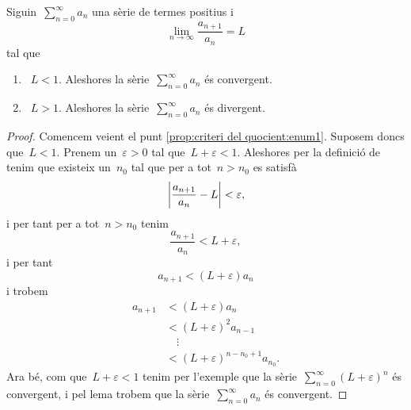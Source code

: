 \documentclass[../../main.tex]{subfiles}
\begin{document}
    \begin{proposition}
        \label{prop:criteri del quocient}
        Siguin~\(\sum_{n=0}^{\infty}a_{n}\) una sèrie de termes positius i
        \[
            \lim_{n\to\infty}\frac{a_{n+1}}{a_{n}}=L
        \]
        tal que
        \begin{enumerate}
            \item\label{prop:criteri del quocient:enum1}~\(L<1\).
            Aleshores la sèrie~\(\sum_{n=0}^{\infty}a_{n}\) és convergent.
            \item\label{prop:criteri del quocient:enum2}~\(L>1\).
            Aleshores la sèrie~\(\sum_{n=0}^{\infty}a_{n}\) és divergent.
        \end{enumerate}
        \begin{proof}
            Comencem veient el punt \eqref{prop:criteri del quocient:enum1}.
            Suposem doncs que~\(L<1\).
            Prenem un~\(\varepsilon>0\) tal que~\(L+\varepsilon<1\).
            Aleshores per la definició de  tenim que existeix un~\(n_{0}\) tal que per a tot~\(n>n_{0}\) es satisfà
            \[
                \abs{\frac{a_{n+1}}{a_{n}}-L}<\varepsilon,
            \]
            i per tant per a tot~\(n>n_{0}\) tenim
            \[
                \frac{a_{n+1}}{a_{n}}<L+\varepsilon,
            \]
            i per tant
            \[
                a_{n+1}<(L+\varepsilon)a_{n}
            \]
            i trobem
            \begin{align*}
                a_{n+1}&<(L+\varepsilon)a_{n}\\
                &<(L+\varepsilon)^{2}a_{n-1}\\
                &\quad\vdots\\
                &<(L+\varepsilon)^{n-n_{0}+1}a_{n_{0}}.
            \end{align*}
            Ara bé, com que~\(L+\varepsilon<1\) tenim per l'exemple  que la sèrie~\(\sum_{n=0}^{\infty}(L+\varepsilon)^{n}\) és convergent, i pel lema  trobem que la sèrie~\(\sum_{n=0}^{\infty}a_{n}\) és convergent.


\end{proof}
\end{proposition}
\end{document}
